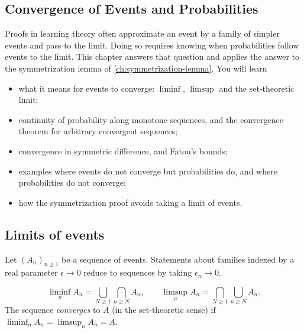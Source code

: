 \begin{notechapter}
\chapter{Convergence of Events and Probabilities}\label{ch:convergence-of-events}

\begin{chapterintro}
Proofs in learning theory often approximate an event by a family of simpler
events and pass to the limit. Doing so requires knowing when probabilities
follow events to the limit. This chapter answers that question and applies the
answer to the symmetrization lemma of \cref{ch:symmetrization-lemma}. You will
learn
\begin{itemize}[nosep]
  \item what it means for events to converge: $\liminf$, $\limsup$ and the
        set-theoretic limit;
  \item continuity of probability along monotone sequences, and the
        convergence theorem for arbitrary convergent sequences;
  \item convergence in symmetric difference, and Fatou's bounds;
  \item examples where events do not converge but probabilities do, and
        where probabilities do not converge;
  \item how the symmetrization proof avoids taking a limit of events.
\end{itemize}
\end{chapterintro}

\section{Limits of events}\label{convergence-of-events:sec:limits}

Let $(A_n)_{n\geq1}$ be a sequence of events. Statements about families indexed by
a real parameter $\epsilon\to0$ reduce to sequences by taking $\epsilon_n\to0$.

\begin{definition}
\[
  \liminf_nA_n = \bigcup_{N\geq1}\bigcap_{n\geq N}A_n,\qquad
  \limsup_nA_n = \bigcap_{N\geq1}\bigcup_{n\geq N}A_n .
\]
The sequence \emph{converges} to $A$ (in the set-theoretic sense) if
$\liminf_nA_n = \limsup_nA_n = A$.
\end{definition}


\end{notechapter}
